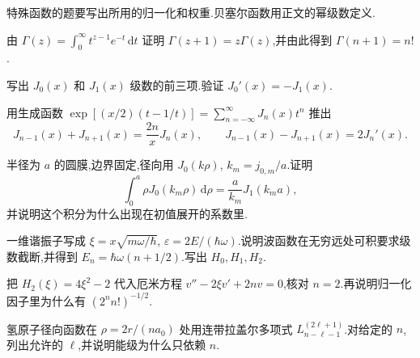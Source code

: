 特殊函数的题要写出所用的归一化和权重.贝塞尔函数用正文的幂级数定义.

\begin{problemset}
\renewcommand{\theenumi}{\thechapter.\arabic{enumi}}
\renewcommand{\labelenumi}{\theenumi.}
\item 由 $\Gamma(z)=\int_0^{\infty}t^{z-1}e^{-t}\,\mathrm{d}t$ 证明 $\Gamma(z+1)=z\Gamma(z)$,并由此得到 $\Gamma(n+1)=n!$.

\item 写出 $J_0(x)$ 和 $J_1(x)$ 级数的前三项.验证 $J_0'(x)=-J_1(x)$.

\item 用生成函数 $\exp[(x/2)(t-1/t)]=\sum_{n=-\infty}^{\infty}J_n(x)t^n$ 推出
\begin{equation*}
  J_{n-1}(x)+J_{n+1}(x)=\frac{2n}{x}J_n(x),
  \qquad
  J_{n-1}(x)-J_{n+1}(x)=2J_n'(x).
\end{equation*}

\item 半径为 $a$ 的圆膜,边界固定,径向用 $J_0(k\rho)$, $k_m=j_{0,m}/a$.证明
\begin{equation*}
  \int_0^a \rho J_0(k_m\rho)\,\mathrm{d}\rho
  =\frac{a}{k_m}J_1(k_m a),
\end{equation*}
并说明这个积分为什么出现在初值展开的系数里.

\item 一维谐振子写成 $\xi=x\sqrt{m\omega/\hbar}$, $\varepsilon=2E/(\hbar\omega)$.说明波函数在无穷远处可积要求级数截断,并得到 $E_n=\hbar\omega(n+1/2)$.写出 $H_0,H_1,H_2$.

\item 把 $H_2(\xi)=4\xi^2-2$ 代入厄米方程 $v''-2\xi v'+2n v=0$,核对 $n=2$.再说明归一化因子里为什么有 $(2^n n!)^{-1/2}$.

\item 氢原子径向函数在 $\rho=2r/(na_0)$ 处用连带拉盖尔多项式 $L_{n-\ell-1}^{(2\ell+1)}$.对给定的 $n$,列出允许的 $\ell$,并说明能级为什么只依赖 $n$.
\end{problemset}
